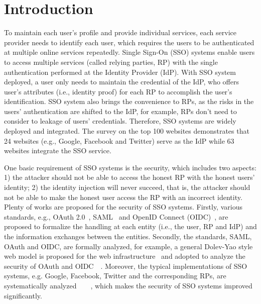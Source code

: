 \section{Introduction}
\label{sec:intro}


To maintain each user's profile and provide individual services, each service provider needs to identify each user, which requires the users to be authenticated at multiple online services repeatedly. 
Single Sign-On (SSO) systems enable users to access multiple services (called relying parties, RP) with the single authentication performed at the Identity Provider (IdP). With SSO system deployed, a user only needs to maintain the credential of the IdP, who offers user's attributes (i.e., identity proof) for each RP to accomplish the user's identification. 
SSO system also brings the convenience to RPs, as the risks in the users' authentication are shifted to the IdP, for example, RPs don't need to consider to leakage of users' credentials. 
Therefore, SSO systems are widely deployed and integrated. 
The survey on the top 100 websites demonstrates that 24 websites (e.g., Google, Facebook and Twitter) serve as the IdP while 63 websites integrate the SSO service.  



One basic requirement of SSO systems is the security, which includes two aspects: 1) the attacker should not be able to access the honest RP with the honest users' identity; 2) the identity injection will never succeed, that is, the attacker should not be able to make the honest user access the RP with an incorrect identity. Plenty of works are proposed for the security of SSO systems. 
Firstly, various standards, e.g., OAuth 2.0~\cite{rfc6749}, SAML~\cite{SAML} and OpenID Connect (OIDC)~\cite{OpenIDConnect}, are proposed to formalize the handling at each entity (i.e.,  the user, RP and IdP)  and the information exchanges between the entities. 
Secondly, the standards, SAML, OAuth and OIDC, are formally analyzed, for example, a general Dolev-Yao style web model is proposed for the web infrastructure~\cite{webmodel} and adopted to analyze the security of OAuth and OIDC~\cite{FettKS16}~\cite{FettKS17}.
Moreover, the typical implementations of SSO systems, e.g. Google, Facebook, Twitter and the corresponding RPs, are systematically analyzed~\cite{WangCW12}~\cite{FettKS16}~\cite{ZhouE14}~\cite{WangZLG16}, which makes  the security of SSO systems improved significantly.

